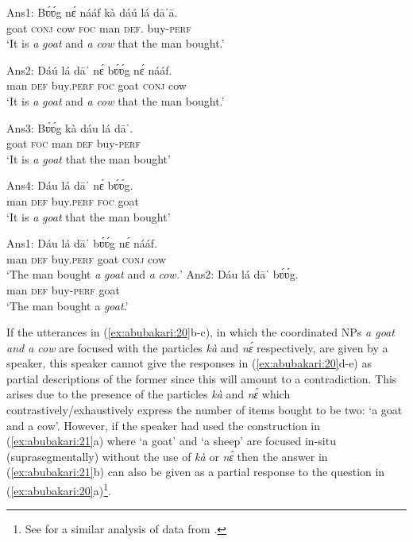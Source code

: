 \documentclass[output=paper,modfonts,nonflat,
 hidelinks
]{langsci/langscibook}
\begin{document}
\ex\label{ex:abubakari:20b}
Ans1: \gll Bʋ́ʋ́g  nɛ́  nááf  kà  dáú  lá  dāˈā.\\
goat    \textsc{conj}  cow  \textsc{foc}  man  \textsc{def}.  buy-\textsc{perf}\\
\glt ‘It is \textit{a} \textit{goat} and \textit{a} \textit{cow} that the man bought.’

\ex\label{ex:abubakari:20c}
Ans2: \gll Dáú  lá  dāˈ    nɛ́  bʋ́ʋ́g  nɛ́  nááf.\\
man  \textsc{def}  buy.\textsc{perf}  \textsc{foc}  goat  \textsc{conj}  cow \\
\glt ‘It is \textit{a} \textit{goat} and \textit{a} \textit{cow} that the man bought.’

\ex\label{ex:abubakari:20d}
Ans3: \gll {\#}Bʋ́ʋ́g  kà  dáu  lá  dāˈ.\\ 
goat    \textsc{foc}  man  \textsc{def}  buy-\textsc{perf}\\                           
\glt ‘It is \textit{a goat} that the man bought’          

\ex\label{ex:abubakari:20e}
Ans4: \gll {\#}Dáu  lá  dāˈ    nɛ́  bʋ́ʋ́g.\\   
man  \textsc{def}  buy.\textsc{perf}  \textsc{foc}  goat\\
\glt ‘It is \textit{a} \textit{goat} that the man bought’
\z
\z

\ea\label{ex:abubakari:21}
\ea\label{ex:abubakari:21a}
Ans1: \gll Dáu  lá  dāˈ    bʋ́ʋ́g  nɛ́  nááf.\\
man  \textsc{def}  buy.\textsc{perf}  goat  \textsc{conj}  cow\\                 
\glt ‘The man bought \textit{a} \textit{goat} and \textit{a} \textit{cow.}’     
\ex\label{ex:abubakari:21b}
Ans2: \gll Dáu  lá  dāˈ    bʋ́ʋ́g.\\  
man  \textsc{def}  buy-\textsc{perf}  goat\\  
\glt ‘The man bought {a} \textit{goat}.’
\z
\z

If the utterances in (\ref{ex:abubakari:20}b-c), in which the coordinated NPs \textit{a goat and a cow} are focused with the particles \textit{kà} and \textit{nɛ́} respectively, are given by a speaker, this speaker cannot give the responses in (\ref{ex:abubakari:20}d-e) as partial descriptions of the former since this will amount to a contradiction. This arises due to the presence of the particles \textit{kà} and \textit{nɛ́} which contrastively{\slash}exhaustively express the number of items bought to be two: 
`a goat and a cow'. However, if the speaker had used the construction in (\ref{ex:abubakari:21}a) where `a goat' and `a sheep' are focused in-situ (suprasegmentally) without the use of \textit{kà} or \textit{nɛ́} then the answer in (\ref{ex:abubakari:21}b) can also be given as a partial response to the question in (\ref{ex:abubakari:20}a)\footnote{See \citet{duah2015} for a similar analysis of data from .}. 
\end{document}
